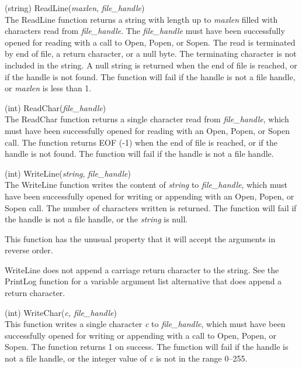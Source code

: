 \begin{description}
\item{(string) \vt ReadLine({\it maxlen\/}, {\it file\_handle\/})}\\
The {\vt ReadLine} function returns a string with length up to {\it
maxlen\/} filled with characters read from {\it file\_handle\/}.  The
{\it file\_handle\/} must have been successfully opened for reading
with a call to {\vt Open}, {\vt Popen}, or {\vt Sopen}.  The read is
terminated by end of file, a return character, or a null byte.  The
terminating character is not included in the string.  A null string is
returned when the end of file is reached, or if the handle is not
found.  The function will fail if the handle is not a file handle, or
{\it maxlen} is less than 1.

\item{(int) \vt ReadChar({\it file\_handle\/})}\\
The {\vt ReadChar} function returns a single character read from {\it
file\_handle\/}, which must have been successfully opened for reading
with an {\vt Open}, {\vt Popen}, or {\vt Sopen} call.  The function
returns EOF (-1) when the end of file is reached, or if the handle is
not found.  The function will fail if the handle is not a file handle.

\item{(int) \vt WriteLine({\it string\/}, {\it file\_handle\/})}\\
The {\vt WriteLine} function writes the content of {\it string\/} to
{\it file\_handle\/}, which must have been successfully opened for
writing or appending with an {\vt Open}, {\vt Popen}, or {\vt Sopen}
call.  The number of characters written is returned.  The function
will fail if the handle is not a file handle, or the {\it string} is
null.

This function has the unusual property that it will accept the
arguments in reverse order.

{\vt WriteLine} does not append a carriage return character to the
string.  See the {\vt PrintLog} function for a variable argument list
alternative that does append a return character.

\item{(int) \vt WriteChar({\it c, file\_handle\/})}\\
This function writes a single character {\it c\/} to {\it
file\_handle\/}, which must have been successfully opened for writing
or appending with a call to {\vt Open}, {\vt Popen}, or {\vt Sopen}. 
The function returns 1 on success.  The function will fail if the
handle is not a file handle, or the integer value of {\it c} is not in
the range 0--255.


\end{description}
